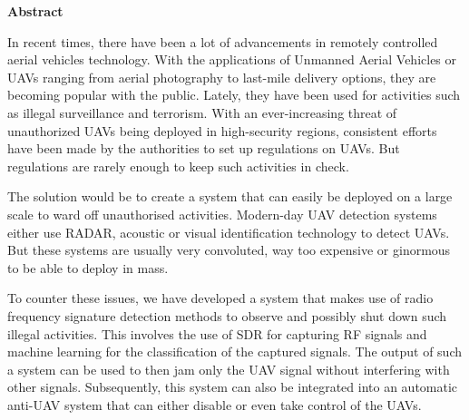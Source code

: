 \begin{center}
\begin{huge}
\bfseries{Abstract}
\end{huge}
\end{center}
\noindent In recent times, there have been a lot of advancements in remotely controlled aerial vehicles technology. With the applications of Unmanned Aerial Vehicles or UAVs ranging from aerial photography to last-mile delivery options, they are becoming popular with the public. Lately, they have been used for activities such as illegal surveillance and terrorism. With an ever-increasing threat of unauthorized UAVs being deployed in high-security regions, consistent efforts have been made by the authorities to set up regulations on UAVs. But regulations are rarely enough to keep such activities in check.

\noindent The solution would be to create a system that can easily be deployed on a large scale to ward off unauthorised activities. Modern-day UAV detection systems either use RADAR, acoustic or visual identification technology to detect UAVs. But these systems are usually very convoluted, way too expensive or ginormous to be able to deploy in mass.

\noindent To counter these issues, we have developed a system that makes use of radio frequency signature detection methods to observe and possibly shut down such illegal activities. This involves the use of SDR for capturing RF signals and machine learning for the classification of the captured signals. The output of such a system can be used to then jam only the UAV signal without interfering with other signals. Subsequently, this system can also be integrated into an automatic anti-UAV system that can either disable or even take control of the UAVs.\pagebreak




